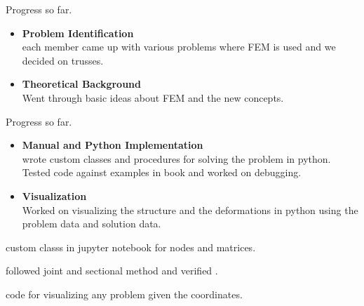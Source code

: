 \documentclass{beamer}
\begin{document}
\begin{frame}[t]{Progress so far.}
	\begin{itemize}
		\item \textbf{Problem Identification}\\
			each member came up with various problems where FEM is used and we decided on trusses.
			
				\item \textbf{Theoretical Background}\\
			Went through basic ideas about FEM and the new concepts.
		\end{itemize}

\end{frame}

\begin{frame}[t]{Progress so far. }
	\begin{itemize}
		\item \textbf{Manual and Python Implementation}\\
		wrote custom classes and procedures for solving the problem in python. Tested code against examples in book and worked on  debugging.
		
		\item \textbf{Visualization}\\
		Worked on visualizing the structure and the deformations in python using the problem data and solution data.\\
		
	
	\end{itemize}
	
\end{frame}


\begin{frame}
	\begin{exampleblock}{\textbf{}}
		custom classs in jupyter notebook for nodes and matrices.
		
		
	\end{exampleblock}\vspace{20pt}
	
	
	
	\begin{block} {\textbf{}}
		followed joint and sectional method and verified .
	\end{block}\vspace{20pt}
	
	\begin{block}{\textbf{}}
		code for visualizing any problem given the coordinates.
		
	\end{block}
	
\end{frame} 
\end{document}
